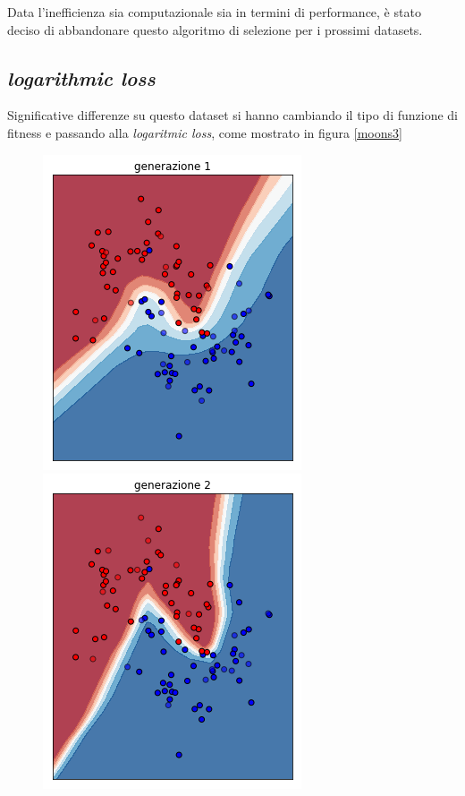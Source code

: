\documentclass[12pt,a4paper]{report}
\begin{document}
Data l'inefficienza sia computazionale sia in termini di performance, è stato deciso di abbandonare questo algoritmo di selezione per i prossimi datasets.

\subsection{\textit{logarithmic loss}}

Significative differenze su questo dataset si hanno cambiando il tipo di funzione di fitness e passando alla \textit{logaritmic loss}, come mostrato in figura \ref{moons3}

\begin{figure}[H]
 \centering
 \includegraphics[scale = 0.35]{images/moons-rnd-log./1}
 \includegraphics[scale = 0.35]{images/moons-rnd-log./2}

\end{figure}
\end{document}
